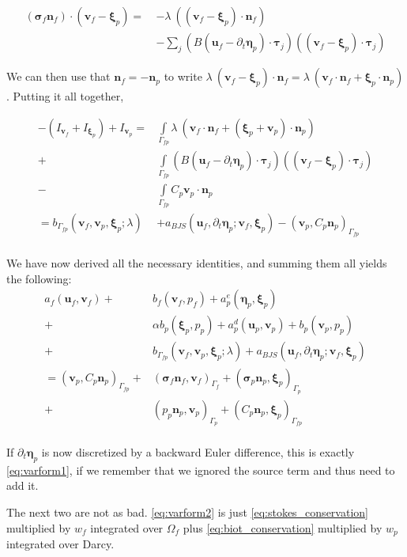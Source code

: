 \documentclass{article}
\newcommand{\mathspace}[1]{\ensuremath{#1}\xspace} %
\newcommand{\sigmabf}{\mathspace{\boldsymbol{\sigma}}}
\newcommand{\inner}[2]{\mathspace{\left (#1, #2 \right)}}
\newcommand{\ddt}[1]{\mathspace{\partial_t #1}}
\newcommand{\taubf}{\mathspace{\boldsymbol{\tau}}}
\newcommand{\stokes}{\mathspace{\Omega_{f}}}
\newcommand{\stokesbdy}{\mathspace{\Gamma_{f}}}
\newcommand{\darcybdy}{\mathspace{\Gamma_{p}}}
\newcommand{\interface}{\mathspace{\Gamma_{fp}}}
\newcommand{\nf}{\mathspace{\mathbf{n}_f}}
\newcommand{\np}{\mathspace{\mathbf{n}_p}}
\newcommand{\intI}{\mathspace{\int \limits_{\interface}}}
\newcommand{\uf}{\mathspace{\mathbf{u}_f}}
\newcommand{\vf}{\mathspace{\mathbf{v}_f}}
\newcommand{\up}{\mathspace{\mathbf{u}_p}}
\newcommand{\vp}{\mathspace{\mathbf{v}_p}}
\newcommand{\pf}{\mathspace{p_f}}
\newcommand{\pp}{\mathspace{p_p}}
\newcommand{\wf}{\mathspace{w_f}}
\renewcommand{\wp}{\mathspace{w_p}}
\newcommand{\disp}{\mathspace{\boldsymbol{\eta}_p}}
\newcommand{\disptest}{\mathspace{\boldsymbol{\xi}_p}}
\begin{document}
\begin{align*}
(\sigmabf_f \nf) \cdot (\vf - \disptest) =  \: &-\lambda\:  ((\vf - \disptest) \cdot \nf) \\
  &- \sum_j \left (B \left ( \uf - \ddt{\disp} \right ) \cdot \taubf_j \right ) ((\vf - \disptest) \cdot \taubf_j)
\end{align*}

We can then use that $\nf = - \np$ to write $\lambda \: (\vf - \disptest) \cdot \nf = \lambda \: (\vf  \cdot \nf + \disptest \cdot \np)$.
Putting it all together,

\begin{align*}
  -(I_{\vf} + I_{\disptest}) + I_{\vp}  =& \intI \lambda\: (\vf  \cdot \nf + (\disptest + \vp) \cdot \np) \\
  + &\intI \left (B \left ( \uf - \ddt{\disp} \right ) \cdot \taubf_j \right ) ((\vf - \disptest) \cdot \taubf_j) \\
  - &\intI C_p \vp \cdot \np \\
  = b_{\interface}\left (\vf, \vp, \disptest; \lambda \right ) & + a_{BJS}\left (\uf, \ddt{\disp}; \vf, \disptest \right) - \inner{\vp}{C_p\np}_{\interface} \\
\end{align*}

We have now derived all the necessary identities, and summing them all yields the following:
\begin{align*}
  a_f(\uf, \vf) +& b_f(\vf, \pf)  + a^e_p(\disp, \disptest)  \\ +&\alpha b_p(\disptest, \pp)  + a_p^d(\up, \vp) + b_p(\vp, \pp)  \\
  + &b_{\interface}\left (\vf, \vp, \disptest; \lambda \right ) + a_{BJS}\left (\uf, \ddt{\disp}; \vf, \disptest \right)\\
  = \inner{\vp}{C_p\np}_{\interface} +& (\sigmabf_f\nf, \vf)_{\stokesbdy} + (\sigmabf_p\np, \disptest)_{\darcybdy} \\
  + &(\pp\np, \vp)_{\darcybdy} + \inner{C_p\np}{\disptest}_{\interface}\\
\end{align*}

If \ddt{\disp} is now discretized by a backward Euler difference, this is exactly \eqref{eq:varform1}, if we remember that we ignored the source term and thus need to add it.

The next two are not as bad. \eqref{eq:varform2} is just \eqref{eq:stokes_conservation} multiplied by \wf integrated over \stokes plus \eqref{eq:biot_conservation} multiplied by \wp integrated over Darcy.
\end{document}
